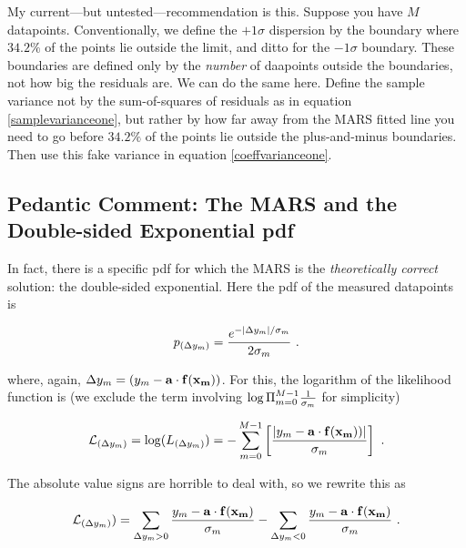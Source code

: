 \documentclass[psfig,preprint]{aastex}
\begin{document}
My current---but untested---recommendation is this. Suppose you have $M$
datapoints.  Conventionally, we define the $+1\sigma$ dispersion by the
boundary where $34.2\%$ of the points lie outside the limit, and ditto for
the $-1\sigma$ boundary. These boundaries are defined only by the {\it
  number} of daapoints outside the boundaries, not how big the residuals
are. We can do the same here. Define the sample variance not by the
sum-of-squares of residuals as in equation \ref{samplevarianceone}, but
rather by how far away from the MARS fitted line you need to go before
$34.2\%$ of the points lie outside the plus-and-minus boundaries. Then
use this fake variance in equation \ref{coeffvarianceone}.

\subsection{ Pedantic Comment: The MARS and the Double-sided
Exponential pdf}

        In fact, there is a specific pdf for which the MARS is the
{\it theoretically correct} solution: the double-sided exponential. Here
the pdf of the measured datapoints is
                                                                                
\begin{equation}
p_{(\Delta y_m)} = { e^{- |\Delta y_m| / \sigma_m} \over 2 \sigma_m} \ .
\end{equation}

\noindent where, again, $\Delta y_m = (y_m - {\bf a \cdot f(x_m)})$.
For this, the logarithm of the likelihood function is (we exclude the
term involving $\log \Pi_{m=0}^{M-1} {1 \over \sigma_m}$ for simplicity)

\begin{mathletters}
\begin{equation}
{\cal L}_{(\Delta y_m)} = \log( L_{(\Delta y_m)}) = - \sum_{m=0}^{M-1}
        \left[ { |y_m - {\bf a \cdot f(x_m)})| \over \sigma_m}  \right] \ .
\end{equation}
                                                                                
\noindent The absolute value signs are horrible to deal with, so we
rewrite this as

\begin{equation}
{\cal L}_{(\Delta y_m)}) =
        \sum_{\Delta y_m > 0}  { y_m - {\bf a \cdot f(x_m)} \over \sigma_m}
        - \sum_{\Delta y_m < 0}  { y_m - {\bf a \cdot f(x_m)} \over \sigma_m}
	\ .
\end{equation} \end{mathletters}
\end{document}

